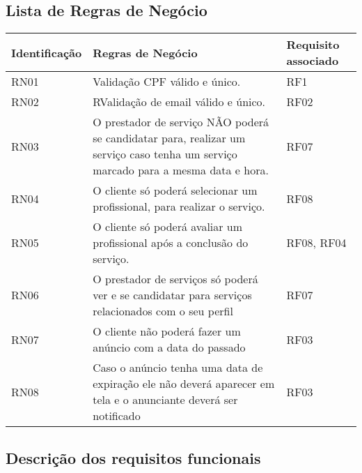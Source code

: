 \subsection{ Lista de Regras de Negócio}

\begin{tabular}{|l|p{8cm}|p{3cm}|}
	\hline
	\textbf{Identificação} & \textbf{Regras de Negócio} & \textbf{Requisito associado} \\ \hline
	RN01 & Validação CPF válido e único. & RF1 \\ \hline
	RN02 & RValidação de email válido e único. & RF02 \\ \hline
	RN03 & O prestador de serviço NÃO poderá se candidatar para, realizar um serviço caso tenha um serviço marcado para a mesma data e hora. & RF07 \\ \hline
	RN04 & O cliente só poderá selecionar um profissional, para realizar o serviço. & RF08 \\ \hline
	RN05 & O cliente só poderá avaliar um profissional após a conclusão do serviço. & RF08, RF04 \\ \hline
	RN06 & O prestador de serviços só poderá ver e se candidatar para serviços relacionados com o seu perfil  & RF07 \\ \hline
	RN07 & O cliente não poderá fazer um anúncio com a data do passado  & RF03 \\ \hline
	RN08 & Caso o anúncio tenha uma data de expiração ele não deverá aparecer em tela e o anunciante deverá ser notificado & RF03 \\ \hline
\end{tabular}


\subsection{Descrição dos requisitos funcionais }

